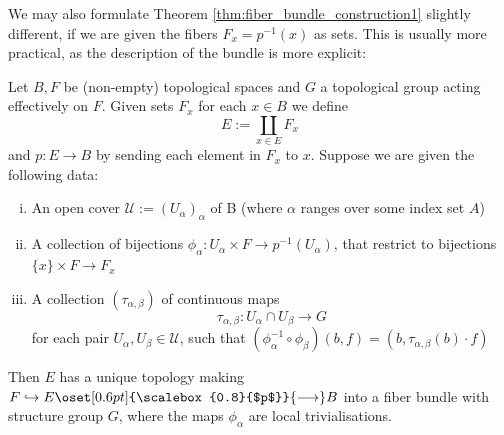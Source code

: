      We may also formulate Theorem \ref{thm:fiber_bundle_construction1} slightly different, if we are given the fibers $F_x = p^{-1}(x)$ as sets. This is usually more practical, as the description of the bundle is more explicit:

     \begin{theorem}
        \label{thm:fiber_bundle_construction2}
        Let $B,F$ be (non-empty) topological spaces and $G$ a topological group acting effectively on $F$. Given sets $F_x$ for each $x \in B$ we define $$E := \coprod_{x \in E}F_x$$ and $p \colon E \to B$ by sending each element in $F_x$ to $x$. Suppose we are given the following data:
        \begin{enumerate}[(i)]
            \item An open cover $\mathcal{U} := (U_\alpha)_\alpha$ of B (where $\alpha$ ranges over some index set $A$)
            \item A collection of bijections $\phi_\alpha \colon U_\alpha \times F \to p^{-1}(U_\alpha)$, that restrict to bijections $\{x\} \times F \to F_x$
            \item  A collection $(\tau_{\alpha,\beta})$ of continuous maps
            \[
            \tau_{\alpha,\beta} \colon U_\alpha \cap U_\beta \to G
            \]
            for each pair $U_\alpha,U_\beta \in \mathcal{U}$, such that $(\phi_\alpha^{-1} \circ \phi_\beta)(b,f) = (b,\tau_{\alpha,\beta}(b) \cdot f)$
        \end{enumerate}
        Then $E$ has a unique topology making $F \hookrightarrow E \oset[0.6pt]{\scalebox{0.8}{$p$}}{\longrightarrow} B$ into a fiber bundle with structure group $G$, where the maps $\phi_\alpha$ are local trivialisations.
     \end{theorem}
